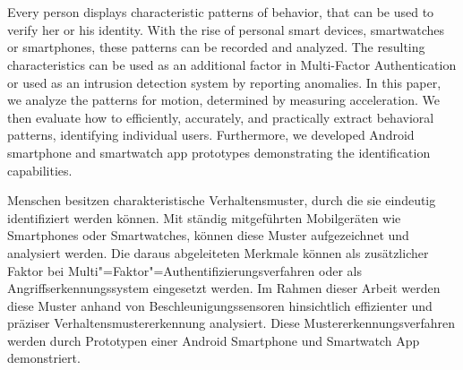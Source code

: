 \chapter{\abstractname}
Every person displays characteristic patterns of behavior, that can be used to verify her or his identity. With the rise of personal smart devices, \eg smartwatches or smartphones, these patterns can be recorded and analyzed. The resulting characteristics can be used as an additional factor in Multi-Factor Authentication or used as an intrusion detection system by reporting anomalies.
In this paper, we analyze the patterns for motion, determined by measuring acceleration. We then evaluate how to efficiently, accurately, and practically extract behavioral patterns, identifying individual users. Furthermore, we developed Android smartphone and smartwatch app prototypes demonstrating the identification capabilities.

\vspace{3cm}
\noindent
Menschen besitzen charakteristische Verhaltensmuster, durch die sie eindeutig identifiziert werden können. Mit ständig mitgeführten Mobilgeräten wie Smartphones oder Smartwatches, können diese Muster aufgezeichnet und analysiert werden. Die daraus abgeleiteten Merkmale können als zusätzlicher Faktor bei Multi"=Faktor"=Authentifizierungsverfahren oder als Angriffserkennungssystem eingesetzt werden.
Im Rahmen dieser Arbeit werden diese Muster anhand von Beschleunigungssensoren hinsichtlich effizienter und präziser Verhaltensmustererkennung analysiert. Diese Mustererkennungsverfahren werden durch Prototypen einer Android Smartphone und Smartwatch App demonstriert.
\frenchspacing
